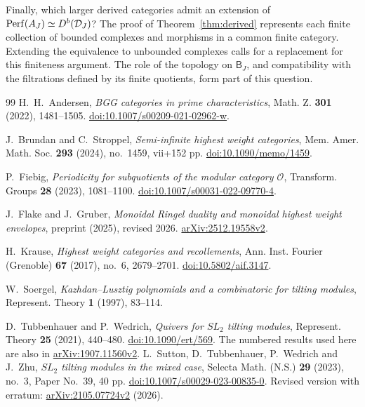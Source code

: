 \documentclass[11pt,reqno]{amsart}
\newcommand{\BJ}{\mathsf B_J}\newcommand{\BK}{\mathsf B_K}\newcommand{\TJ}{\mathbb T_J}\newcommand{\GK}{\mathsf G_K}\newcommand{\GJ}{\mathsf G_J}
\theoremstyle{definition}
\theoremstyle{remark}
\numberwithin{equation}{section}
\begin{document}
Finally, which larger derived categories admit an extension of
$\operatorname{Perf}(A_J)\simeq D^b(\mathcal D_J)$? The proof of
Theorem~\ref{thm:derived} represents each finite collection of bounded
complexes and morphisms in a common finite category. Extending the
equivalence to unbounded complexes calls for a replacement for this
finiteness argument. The role of the topology on $\BJ$, and compatibility
with the filtrations defined by its finite quotients, form part of
this question.

\clearpage
\begin{thebibliography}{99}
H.~H.~Andersen,
\emph{BGG categories in prime characteristics},
Math. Z. \textbf{301} (2022), 1481--1505.
\href{https://doi.org/10.1007/s00209-021-02962-w}{doi:10.1007/s00209-021-02962-w}.

J.~Brundan and C.~Stroppel,
\emph{Semi-infinite highest weight categories},
Mem. Amer. Math. Soc. \textbf{293} (2024), no.~1459, vii+152 pp.
\href{https://doi.org/10.1090/memo/1459}{doi:10.1090/memo/1459}.

P.~Fiebig,
\emph{Periodicity for subquotients of the modular category $\mathcal O$},
Transform. Groups \textbf{28} (2023), 1081--1100.
\href{https://doi.org/10.1007/s00031-022-09770-4}{doi:10.1007/s00031-022-09770-4}.

J.~Flake and J.~Gruber,
\emph{Monoidal Ringel duality and monoidal highest weight envelopes},
preprint (2025), revised 2026.
\href{https://arxiv.org/abs/2512.19558v2}{arXiv:2512.19558v2}.

H.~Krause,
\emph{Highest weight categories and recollements},
Ann. Inst. Fourier (Grenoble) \textbf{67} (2017), no.~6, 2679--2701.
\href{https://doi.org/10.5802/aif.3147}{doi:10.5802/aif.3147}.

W.~Soergel,
\emph{Kazhdan--Lusztig polynomials and a combinatoric for tilting modules},
Represent. Theory \textbf{1} (1997), 83--114.

D.~Tubbenhauer and P.~Wedrich,
\emph{Quivers for $SL_2$ tilting modules},
Represent. Theory \textbf{25} (2021), 440--480.
\href{https://doi.org/10.1090/ert/569}{doi:10.1090/ert/569}.
The numbered results used here are also in
\href{https://arxiv.org/abs/1907.11560v2}{arXiv:1907.11560v2}.
L.~Sutton, D.~Tubbenhauer, P.~Wedrich and J.~Zhu,
\emph{$SL_2$ tilting modules in the mixed case},
Selecta Math. (N.S.) \textbf{29} (2023), no.~3, Paper No.~39, 40 pp.
\href{https://doi.org/10.1007/s00029-023-00835-0}{doi:10.1007/s00029-023-00835-0}.
Revised version with erratum:
\href{https://arxiv.org/abs/2105.07724v2}{arXiv:2105.07724v2} (2026).
\end{thebibliography}
\end{document}
